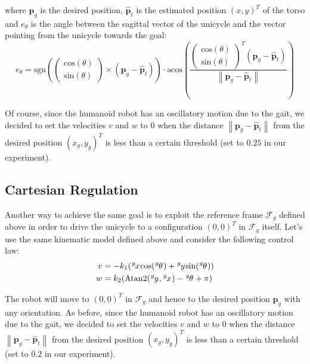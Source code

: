 \documentclass[a4paper]{article}
\begin{document}
\noindent where $\bm{p}_g$ is the desired position, $\bm{\hat{p}}_t$ is
the estimated position $(x, y)^T$ of the torso and $e_{\theta}$ is the angle
between the sagittal vector of the
unicycle and the vector pointing from the unicycle towards the goal:
\begin{equation}
    e_{\theta} = \text{sgn}\left(
        \begin{pmatrix}
            \text{cos}(\theta) \\
            \text{sin}(\theta)
        \end{pmatrix}
    \times (\bm{p}_g - \bm{\hat{p}}_t)
    \right) \cdot
    \text{acos}\left(
        \frac{
        \begin{pmatrix}
            \text{cos}(\theta) \\
            \text{sin}(\theta)
        \end{pmatrix}^T (\bm{p}_g - \bm{\hat{p}}_t)
        }{\left\|\bm{p}_g - \bm{\hat{p}}_t\right\|}
    \right)
\end{equation}

Of course, since the humanoid robot has an oscillatory motion due to the
gait, we decided to set the velocities $v$ and $w$ to $0$ when the distance
$\left\|\bm{p}_g - \bm{\hat{p}}_t \right\|$
from the desired position $(x_g, y_g)^T$ is less than a certain threshold (set
to $0.25$ in our experiment).

\subsection{Cartesian Regulation}
\label{subsec:cartesian_regulation}
Another way to achieve the same goal is to exploit the reference frame
$\mathcal{F}_g$ defined above in order to drive the unicycle to a configuration
$(0, 0)^T$ in $\mathcal{F}_g$ itself. Let's use the same kinematic model
defined above and consider the following control law:
\begin{align}
    \label{eq:cartesian-regulation-control-law-v}
    v &= -k_1 (\tensor[^g]{x}{} \text{cos}(\tensor[^g]{\theta}{}) + \tensor[^g]{y}{} \text{sin}(\tensor[^g]{\theta}{})) \\
    \label{eq:cartesian-regulation-control-law-w}
    w &=  k_2 (\text{Atan2}(\tensor[^g]{y}{}, \tensor[^g]{x}{}) - \tensor[^g]{\theta}{} + \pi)
\end{align}

The robot will move to $(0, 0)^T$ in $\mathcal{F}_g$ and hence to the desired
position $\bm{p}_g$ with any orientation. As before, since the humanoid robot
has an oscillatory motion due to the
gait, we decided to set the velocities $v$ and $w$ to $0$ when the distance
$\left\|\bm{p}_g - \bm{\hat{p}}_t \right\|$
from the desired position $(x_g, y_g)^T$ is less than a certain threshold (set
to $0.2$ in our experiment).
\end{document}
